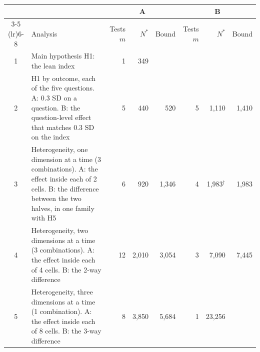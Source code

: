 \begin{tabularx}{\textwidth}{c X rrr rrr}
\toprule
 & & \multicolumn{3}{c}{A} & \multicolumn{3}{c}{B} \\
\cmidrule(lr){3-5} \cmidrule(lr){6-8}
 & Analysis & Tests $m$ & $N^{*}$ & Bound & Tests $m$ & $N^{*}$ & Bound \\
\midrule
1 & Main hypothesis H1: the lean index & 1 & 349 &  &  &  &  \\
2 & H1 by outcome, each of the five questions. A: 0.3 SD on a question. B: the question-level effect that matches 0.3 SD on the index & 5 & 440 & 520 & 5 & 1,110 & 1,410 \\
3 & Heterogeneity, one dimension at a time (3 combinations). A: the effect inside each of 2 cells. B: the difference between the two halves, in one family with H5 & 6 & 920 & 1,346 & 4 & 1,983$^{\dagger}$ & 1,983 \\
4 & Heterogeneity, two dimensions at a time (3 combinations). A: the effect inside each of 4 cells. B: the 2-way difference & 12 & 2,010 & 3,054 & 3 & 7,090 & 7,445 \\
5 & Heterogeneity, three dimensions at a time (1 combination). A: the effect inside each of 8 cells. B: the 3-way difference & 8 & 3,850 & 5,684 & 1 & 23,256 &  \\
\bottomrule
\end{tabularx}

